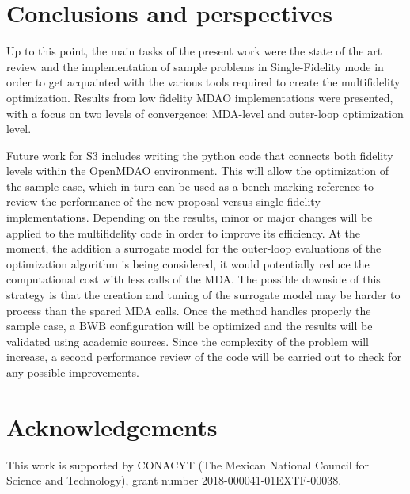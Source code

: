 \section{Conclusions and perspectives}
\label{sec:conclusions}
Up to this point, the main tasks of the present work were the state of the art review and the implementation of sample problems in Single-Fidelity mode in order to get acquainted with the various tools required to create the multifidelity optimization. Results from low fidelity MDAO implementations were presented, with a focus on two levels of convergence: MDA-level and outer-loop optimization level. \par 
Future work for S3 includes writing the python code that connects both fidelity levels within the OpenMDAO environment. This will allow the optimization of the sample case, which in turn can be used as a bench-marking reference to review the performance of the new proposal versus single-fidelity implementations. Depending on the results, minor or major changes will be applied to the multifidelity code in order to improve its efficiency. At the moment, the addition a surrogate model for the outer-loop evaluations of the optimization algorithm is being considered, it would potentially reduce the computational cost with less calls of the MDA. The possible downside of this strategy is that the creation and tuning of the surrogate model may be harder to process than the spared MDA calls. 
Once the method handles properly the sample case, a BWB configuration will be optimized and the results will be validated using academic sources. Since the complexity of the problem will increase, a second performance review of the code will be carried out to check for any possible improvements.   
\section*{Acknowledgements}
This work is supported by CONACYT (The Mexican National Council for Science and Technology), grant number 2018-000041-01EXTF-00038.
